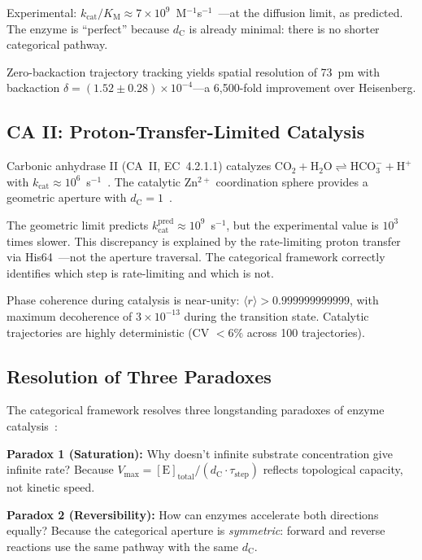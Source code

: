 \documentclass[aps,prx,superscriptaddress,twocolumn,10pt,a4paper,longbibliography,preprint]{revtex4-2}
\newcommand{\dC}{d_{\mathrm{C}}}
\newcommand{\kcat}{k_{\mathrm{cat}}}
\newcommand{\Km}{K_{\mathrm{M}}}
\newcommand{\Vmax}{V_{\mathrm{max}}}
\newcommand{\orderp}{\langle r \rangle}
\theoremstyle{definition}
\theoremstyle{remark}
\begin{document}
Experimental: $\kcat/\Km \approx 7 \times 10^9$~M$^{-1}$s$^{-1}$~\cite{Klug1972}---at the diffusion limit, as predicted. The enzyme is ``perfect'' because $\dC$ is already minimal: there is no shorter categorical pathway.

Zero-backaction trajectory tracking yields spatial resolution of 73~pm with backaction $\delta = (1.52 \pm 0.28) \times 10^{-4}$---a 6,500-fold improvement over Heisenberg.

\subsection{CA II: Proton-Transfer-Limited Catalysis}

Carbonic anhydrase II (CA~II, EC~4.2.1.1) catalyzes $\text{CO}_2 + \text{H}_2\text{O} \rightleftharpoons \text{HCO}_3^- + \text{H}^+$ with $\kcat \approx 10^6$~s$^{-1}$~\cite{Lindskog1997, Krishnamurthy2008}. The catalytic Zn$^{2+}$ coordination sphere provides a geometric aperture with $\dC = 1$~\cite{Sachikonye2026d}.

The geometric limit predicts $\kcat^{\text{pred}} \approx 10^9$~s$^{-1}$, but the experimental value is $10^3$ times slower. This discrepancy is explained by the rate-limiting proton transfer via His64~\cite{Silverman1988, Tu1989, Maupin2009}---not the aperture traversal. The categorical framework correctly identifies which step is rate-limiting and which is not.

Phase coherence during catalysis is near-unity: $\orderp > 0.999999999999$, with maximum decoherence of $3 \times 10^{-13}$ during the transition state. Catalytic trajectories are highly deterministic (CV $< 6\%$ across 100 trajectories).

\subsection{Resolution of Three Paradoxes}

The categorical framework resolves three longstanding paradoxes of enzyme catalysis~\cite{Sachikonye2026d}:

\textbf{Paradox 1 (Saturation):} Why doesn't infinite substrate concentration give infinite rate? Because $\Vmax = [\text{E}]_{\text{total}}/(\dC \cdot \tau_{\text{step}})$ reflects topological capacity, not kinetic speed.

\textbf{Paradox 2 (Reversibility):} How can enzymes accelerate both directions equally? Because the categorical aperture is \emph{symmetric}: forward and reverse reactions use the same pathway with the same $\dC$.
\end{document}
